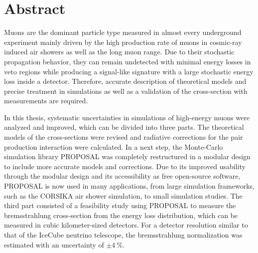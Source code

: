 \thispagestyle{plain}

\section*{Abstract}

Muons are the dominant particle type measured in almost every underground experiment mainly driven by the high production rate of muons in cosmic-ray induced air showers as well as the long muon range.
Due to their stochastic propagation behavior, they can remain undetected with minimal energy losses in veto regions while producing a signal-like signature with a large stochastic energy loss inside a detector.
Therefore, accurate description of theoretical models and precise treatment in simulations as well as a validation of the cross-section with measurements are required.

In this thesis, systematic uncertainties in simulations of high-energy muons were analyzed and improved, which can be divided into three parts.
The theoretical models of the cross-sections were revised and radiative corrections for the pair production interaction were calculated.
In a next step, the Monte-Carlo simulation library PROPOSAL was completely restructured in a modular design to include more accurate models and corrections.
Due to its improved usability through the modular design and its accessibility as free open-source software, PROPOSAL is now used in many applications, from large simulation frameworks, such as the CORSIKA air shower simulation, to small simulation studies.
The third part consisted of a feasibility study using PROPOSAL to measure the bremsstrahlung cross-section from the energy loss distribution, which can be measured in cubic kilometer-sized detectors.
For a detector resolution similar to that of the IceCube neutrino telescope, the bremsstrahlung normalization was estimated with an uncertainty of $\pm \SI{4}{\%}$.


